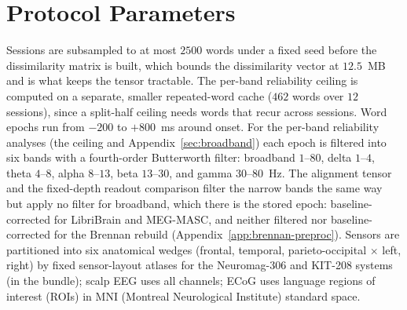\documentclass{article}
\begin{document}
\section{Protocol Parameters}\label{app:protocol}

Sessions are subsampled to at most $2500$ words under a fixed seed before the dissimilarity
matrix is built, which bounds the dissimilarity vector at $12.5$~MB and is what keeps the tensor
tractable. The per-band reliability ceiling is computed on a separate, smaller repeated-word cache
($462$ words over $12$ sessions), since a split-half ceiling needs words that recur across
sessions. Word epochs run from $-200$ to $+800$~ms around onset. For the per-band reliability
analyses (the ceiling and Appendix~\ref{sec:broadband}) each epoch is filtered into six bands with a
fourth-order Butterworth filter: broadband $1$--$80$, delta $1$--$4$, theta $4$--$8$, alpha $8$--$13$,
beta $13$--$30$, and gamma $30$--$80$~Hz. The alignment tensor and the fixed-depth readout comparison
filter the narrow bands the same way but apply no filter for broadband, which there is the stored
epoch: baseline-corrected for LibriBrain and MEG-MASC, and neither filtered nor baseline-corrected for
the Brennan rebuild (Appendix~\ref{app:brennan-preproc}). Sensors are partitioned into six
anatomical wedges (frontal, temporal, parieto-occipital $\times$ left, right) by fixed sensor-layout
atlases for the Neuromag-306 and KIT-208 systems (in the bundle); scalp EEG uses all channels; ECoG uses language
regions of interest (ROIs) in MNI (Montreal Neurological Institute) standard space.
\end{document}

